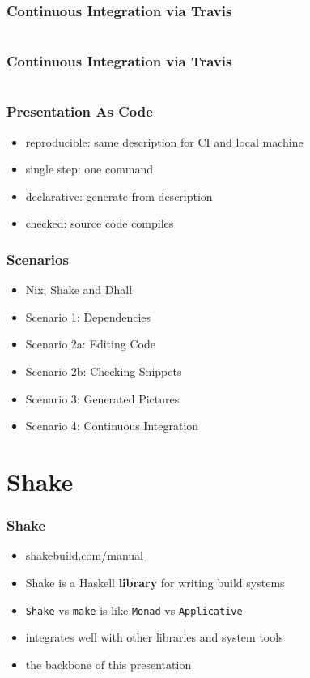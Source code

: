 \documentclass{beamer}
\begin{document}
\begin{frame}
  \frametitle{Continuous Integration via Travis}
  \inputminted[linenos=false, fontsize=\tiny, firstline=61, lastline=90]{yaml}{static-source/long-travis-ci.yml}
\end{frame}

\begin{frame}
  \frametitle{Continuous Integration via Travis}
  \inputminted[linenos=false, fontsize=\tiny, firstline=91, lastline=120]{yaml}{static-source/long-travis-ci.yml}
\end{frame}

\begin{frame}
  \frametitle{Presentation As Code}
  \begin{itemize}
  \item reproducible: same description for CI and local machine
  \item single step: one command
  \item declarative: generate from description
  \item checked: source code compiles
  \end{itemize}
\end{frame}

\begin{frame}
  \frametitle{Scenarios}
  \begin{itemize}
  \item Nix, Shake and Dhall
  \item Scenario 1: Dependencies
  \item Scenario 2a: Editing Code
  \item Scenario 2b: Checking Snippets
  \item Scenario 3: Generated Pictures
  \item Scenario 4: Continuous Integration
  \end{itemize}
\end{frame}

\section{Shake}

\begin{frame}
  \frametitle{Shake}
  \begin{itemize}
  \item \url{shakebuild.com/manual}
  \item Shake is a Haskell \textbf{library} for writing build systems
  \item \texttt{Shake} vs \texttt{make} is like \texttt{Monad} vs \texttt{Applicative}
  \item integrates well with other libraries and system tools
  \item the backbone of this presentation
  \end{itemize}
\end{frame}
\end{document}

